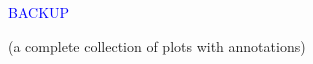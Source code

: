 \documentclass[compress]{beamer}
\begin{document}

\begin{frame}
\begin{center}
\Huge \textcolor{blue}{BACKUP}

\vspace{1 cm}
\large (a complete collection of plots with annotations)
\end{center}
\end{frame}
\end{document}
